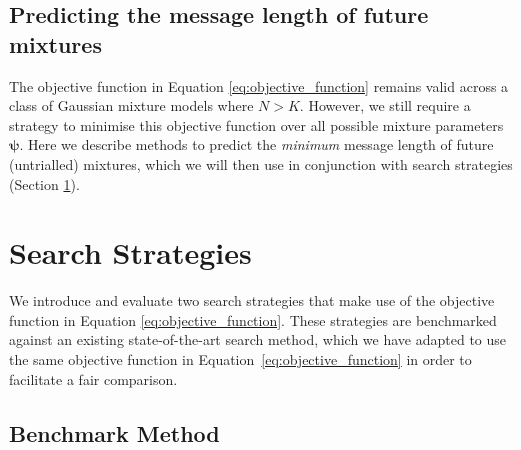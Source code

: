 \documentclass{elsarticle}
\newcommand{\vect}[1]{\boldsymbol{\mathbf{#1}}}
\renewcommand{\vec}[1]{\vect{#1}}
\begin{document}
\subsection{Predicting the message length of future mixtures}

The objective function in Equation \ref{eq:objective_function} remains valid across a class of 
Gaussian mixture models where $N > K$. However, we still require a strategy to minimise this
objective function over all possible mixture parameters $\vec{\psi}$. Here we describe methods to predict
the \emph{minimum} message length of future (untrialled) mixtures, which we will then use in conjunction 
with search strategies (Section \ref{sec:search}).







\section{Search Strategies} \label{sec:search}

We introduce and evaluate two search strategies that make use of the objective function in Equation \ref{eq:objective_function}. These strategies are benchmarked against an existing state-of-the-art search method, which we have adapted to use the same objective function in Equation~\ref{eq:objective_function} in order to facilitate a fair comparison. 


\subsection{Benchmark Method}
\end{document}
